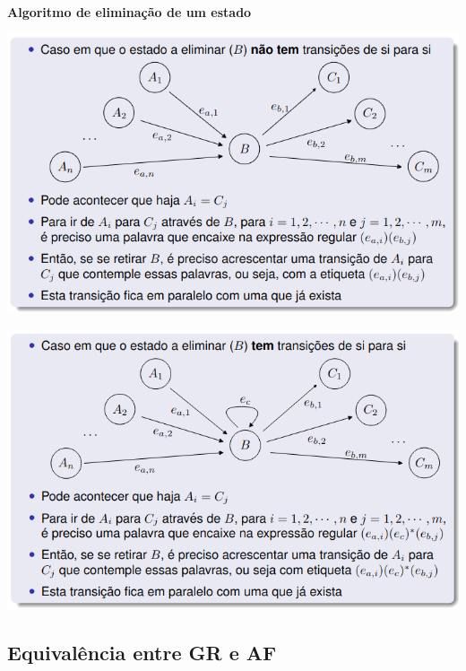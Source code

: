 \documentclass{article}
\begin{document}
\pagebreak

\begin{flushleft}
  \textbf{Algoritmo de eliminação de um estado}

  \begin{center}
    \includegraphics[scale=0.4]{84}
  \end{center}
  \begin{center}
    \includegraphics[scale=0.4]{85}
  \end{center}
\end{flushleft}

\subsection{Equivalência entre GR e AF}
\end{document}
